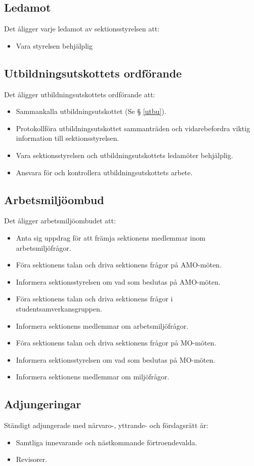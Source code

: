 \documentclass{datateknologsektionen-document}
\begin{document}
\subsection{Ledamot}
\label{ledamot}
Det åligger varje ledamot av sektionsstyrelsen att:
\begin{itemize}
  \item Vara styrelsen behjälplig
\end{itemize}
\subsection{Utbildningsutskottets ordförande}
\label{utbuordf}
Det åligger utbildningsutskottets ordförande att:
\begin{itemize}
  \item Sammankalla utbildningsutskottet (Se § \ref{utbu}).
  \item Protokollföra utbildningsutskottet sammanträden och vidarebefordra viktig information till sektionsstyrelsen.
  \item Vara sektionsstyrelsen och utbildningsutskottets ledamöter behjälplig.
  \item Ansvara för och kontrollera utbildningsutskottets arbete.
\end{itemize}
\subsection{Arbetsmiljöombud}
\label{amo}
Det åligger arbetsmiljöombudet att:
\begin{itemize}
  \item Anta sig uppdrag för att främja sektionens medlemmar inom arbetsmiljöfrågor.
  \item Föra sektionens talan och driva sektionens frågor på AMO-möten.
  \item Informera sektionsstyrelsen om vad som beslutas på AMO-möten.
  \item Föra sektionens talan och driva sektionens frågor i studentsamverkansgruppen.
  \item Informera sektionens medlemmar om arbetsmiljöfrågor.
  \item Föra sektionens talan och driva sektionens frågor på MO-möten.
  \item Informera sektionsstyrelsen om vad som beslutas på MO-möten.
  \item Informera sektionens medlemmar om miljöfrågor.
\end{itemize}
\subsection{Adjungeringar}
Ständigt adjungerade med närvaro-, yttrande- och förslagsrätt är:
\begin{itemize}
  \item Samtliga innevarande och nästkommande förtroendevalda.
  \item Revisorer.
\end{itemize}
\end{document}
